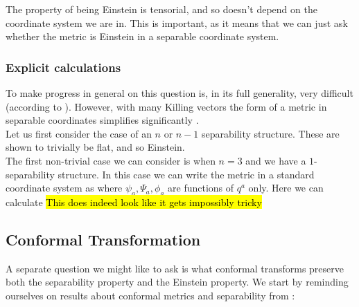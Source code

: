 \documentclass{article}
\begin{document}
\begin{remark}
	The property of being Einstein is tensorial, and so doesn't depend on the coordinate system we are in. This is important, as it means that we can just ask whether the metric is Einstein in a separable coordinate system.
\end{remark}
\subsubsection{Explicit calculations}
To make progress in general on this question is, in its full generality, very difficult (according to  \cite{Benenti1979}). However, with many Killing vectors the form of a metric in separable coordinates simplifies significantly \cite{Benenti1981}. \\
Let us first consider the case of an $n$ or $n-1$ separability structure. These are shown to trivially be flat, and so Einstein. \\
The first non-trivial case we can consider is when $n=3$ and we have a $1$-separability structure. In this case we can write the metric in a standard coordinate system as 
where $\psi_a, \Psi_a, \phi_a$ are functions of $q^a$ only. Here we can calculate
\hl{This does indeed look like it gets impossibly tricky}
\subsection{Conformal Transformation}
A separate question we might like to ask is what conformal transforms preserve both the separability property and the Einstein property. We start by reminding ourselves on results about conformal metrics and separability from \cite{Benenti2005}:
\end{document}
